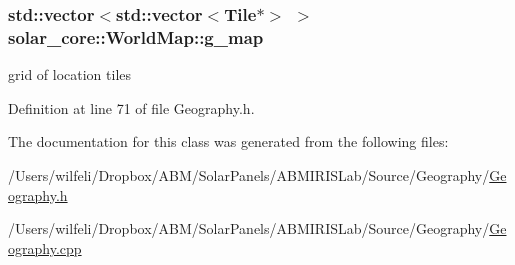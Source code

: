 \subsubsection[{g\+\_\+map}]{\setlength{\rightskip}{0pt plus 5cm}std\+::vector$<$std\+::vector$<${\bf Tile}$\ast$$>$ $>$ solar\+\_\+core\+::\+World\+Map\+::g\+\_\+map}\label{classsolar__core_1_1_world_map_a2b94f74fcea57d3e01d8cab8348e1c48}
grid of location tiles 

Definition at line 71 of file Geography.\+h.



The documentation for this class was generated from the following files\+:\begin{DoxyCompactItemize}
\item 
/\+Users/wilfeli/\+Dropbox/\+A\+B\+M/\+Solar\+Panels/\+A\+B\+M\+I\+R\+I\+S\+Lab/\+Source/\+Geography/\hyperlink{_geography_8h}{Geography.\+h}\item 
/\+Users/wilfeli/\+Dropbox/\+A\+B\+M/\+Solar\+Panels/\+A\+B\+M\+I\+R\+I\+S\+Lab/\+Source/\+Geography/\hyperlink{_geography_8cpp}{Geography.\+cpp}\end{DoxyCompactItemize}

